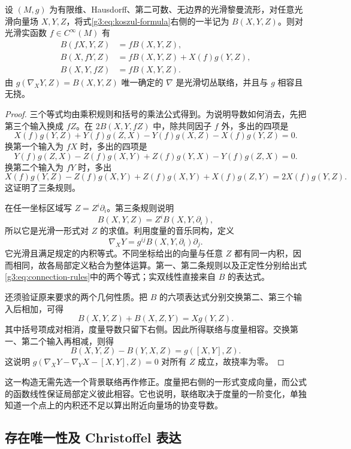 \begin{lemma}\label{g3:lem:koszul-construction}
	设 \((M,g)\) 为有限维、Hausdorff、第二可数、无边界的光滑黎曼流形，对任意光滑向量场 \(X,Y,Z\)，将式\eqref{g3:eq:koszul-formula}右侧的一半记为 \(B(X,Y,Z)\)。则对光滑实函数 \(f\in C^\infty(M)\) 有
	\begin{align*}
		B(fX,Y,Z)&=fB(X,Y,Z),\\
		B(X,fY,Z)&=fB(X,Y,Z)+X(f)g(Y,Z),\\
		B(X,Y,fZ)&=fB(X,Y,Z).
	\end{align*}
	由 \(g(\nabla_XY,Z)=B(X,Y,Z)\) 唯一确定的 \(\nabla\) 是光滑切丛联络，并且与 \(g\) 相容且无挠。
\end{lemma}
\begin{proof}
	三个等式均由乘积规则和括号的乘法公式得到。为说明导数如何消去，先把第三个输入换成 \(fZ\)。在 \(2B(X,Y,fZ)\) 中，除共同因子 \(f\) 外，多出的四项是
	\[
		X(f)g(Y,Z)+Y(f)g(Z,X)-Y(f)g(X,Z)-X(f)g(Y,Z)=0.
	\]
	换第一个输入为 \(fX\) 时，多出的四项是
	\[
		Y(f)g(Z,X)-Z(f)g(X,Y)+Z(f)g(Y,X)-Y(f)g(Z,X)=0.
	\]
	换第二个输入为 \(fY\) 时，多出
	\[
		X(f)g(Y,Z)-Z(f)g(X,Y)+Z(f)g(X,Y)+X(f)g(Z,Y)
		=2X(f)g(Y,Z).
	\]
	这证明了三条规则。

	在任一坐标区域写 \(Z=Z^i\partial_i\)。第三条规则说明
	\[
		B(X,Y,Z)=Z^iB(X,Y,\partial_i),
	\]
	所以它是光滑一形式对 \(Z\) 的求值。利用度量的音乐同构，定义
	\[
		\nabla_XY
		=g^{ij}B(X,Y,\partial_i)\partial_j.
	\]
	它光滑且满足规定的内积等式。不同坐标给出的向量与任意 \(Z\) 都有同一内积，因而相同，故各局部定义粘合为整体运算。第一、第二条规则以及正定性分别给出式\eqref{g3:eq:connection-rules}中的两个等式；实双线性直接来自 \(B\) 的表达式。

	还须验证原来要求的两个几何性质。把 \(B\) 的六项表达式分别交换第二、第三个输入后相加，可得
	\[
		B(X,Y,Z)+B(X,Z,Y)=Xg(Y,Z).
	\]
	其中括号项成对相消，度量导数只留下右侧。因此所得联络与度量相容。交换第一、第二个输入再相减，则得
	\[
		B(X,Y,Z)-B(Y,X,Z)=g([X,Y],Z).
	\]
	这说明 \(g(\nabla_XY-\nabla_YX-[X,Y],Z)=0\) 对所有 \(Z\) 成立，故挠率为零。
\end{proof}

这一构造无需先选一个背景联络再作修正。度量把右侧的一形式变成向量，而公式的函数线性保证局部定义彼此相容。它也说明，联络取决于度量的一阶变化，单独知道一个点上的内积还不足以算出附近向量场的协变导数。

\subsection{存在唯一性及 Christoffel 表达}
\label{g3:subsec:0102:04}

